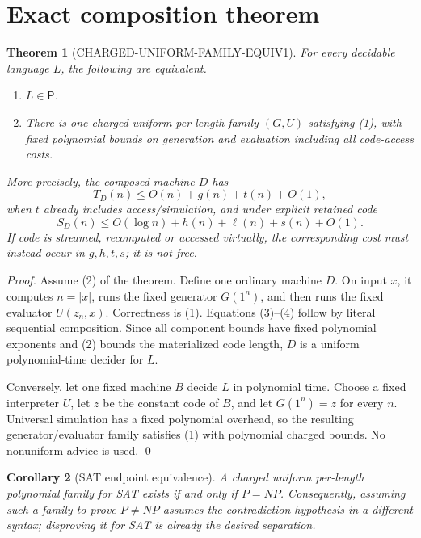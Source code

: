 \documentclass[11pt]{article}
\newtheorem{theorem}{Theorem}
\newtheorem{corollary}[theorem]{Corollary}
\newcommand{\Pclass}{\mathsf{P}}
\begin{document}
\section{Exact composition theorem}

\begin{theorem}[CHARGED-UNIFORM-FAMILY-EQUIV1]
For every decidable language \(L\), the following are equivalent.
\begin{enumerate}
\item \(L\in\Pclass\).
\item There is one charged uniform per-length family \((G,U)\) satisfying
(1), with fixed polynomial bounds on generation and evaluation including all
code-access costs.
\end{enumerate}
More precisely, the composed machine \(D\) has
\[
 T_D(n)\le O(n)+g(n)+t(n)+O(1),                       \tag{3}
\]
when \(t\) already includes access/simulation, and under explicit retained
code
\[
 S_D(n)\le O(\log n)+h(n)+\ell(n)+s(n)+O(1).          \tag{4}
\]
If code is streamed, recomputed or accessed virtually, the corresponding
cost must instead occur in \(g,h,t,s\); it is not free.
\end{theorem}

\begin{proof}
Assume (2) of the theorem.  Define one ordinary machine \(D\).  On input
\(x\), it computes \(n=|x|\), runs the fixed generator \(G(1^n)\), and then
runs the fixed evaluator \(U(z_n,x)\).  Correctness is (1).  Equations
(3)--(4) follow by literal sequential composition.  Since all component
bounds have fixed polynomial exponents and (2) bounds the materialized code
length, \(D\) is a uniform polynomial-time decider for \(L\).

Conversely, let one fixed machine \(B\) decide \(L\) in polynomial time.
Choose a fixed interpreter \(U\), let \(z\) be the constant code of \(B\),
and let \(G(1^n)=z\) for every \(n\).  Universal simulation has a fixed
polynomial overhead, so the resulting generator/evaluator family satisfies
(1) with polynomial charged bounds.  No nonuniform advice is used. \qed
\end{proof}

\begin{corollary}[SAT endpoint equivalence]
A charged uniform per-length polynomial family for SAT exists if and only if
\(P=NP\).  Consequently, assuming such a family to prove \(P\ne NP\) assumes
the contradiction hypothesis in a different syntax; disproving it for SAT is
already the desired separation.
\end{corollary}
\end{document}
